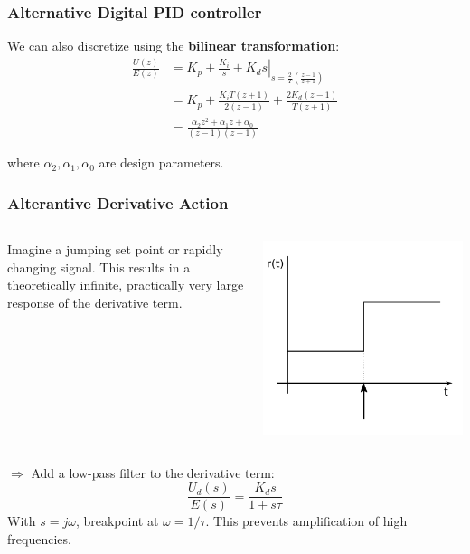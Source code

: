 \begin{frame}
	\frametitle{Alternative Digital PID controller }
	We can also discretize using the \textbf{bilinear transformation}:
	\begin{align*}
		\frac{U(z)}{E(z)} &=  
				\left. K_p + \frac{K_i}{s} + K_d s \right|_
							{s=\frac{2}{T}\left( \frac{z-1}{z+1}\right)}  \\
			&= K_p + \frac{K_iT(z + 1)}{2(z-1)} + \frac{2K_d(z-1)}{T(z+1)} \\
			&= \frac{\alpha_2 z^2 + \alpha_1 z + \alpha_0}{(z-1)(z+1)}
	\end{align*}
	
	where $\alpha_2, \alpha_1, \alpha_0$ are design parameters.
	
\end{frame}

\begin{frame}
	\frametitle{Alterantive Derivative Action}
		\begin{columns}
			\begin{column}{0.7\linewidth}
				Imagine a jumping set point or rapidly changing signal. 
				This results in a theoretically infinite, practically very large response of
				the derivative term.  
			\end{column}
			\begin{column}{0.3\linewidth}
				\includegraphics[width=\linewidth]{img/piecewise-setpoint}
			\end{column}
		\end{columns}
		$\Rightarrow$ Add a low-pass filter to the derivative term:
		\begin{equation*}
			\frac{U_d(s)}{E(s)} = \frac{K_d s}{1+s\tau}
		\end{equation*}
		With $s=j\omega$, breakpoint at $\omega=1/\tau$. This prevents amplification of high frequencies. 
	
\end{frame}

